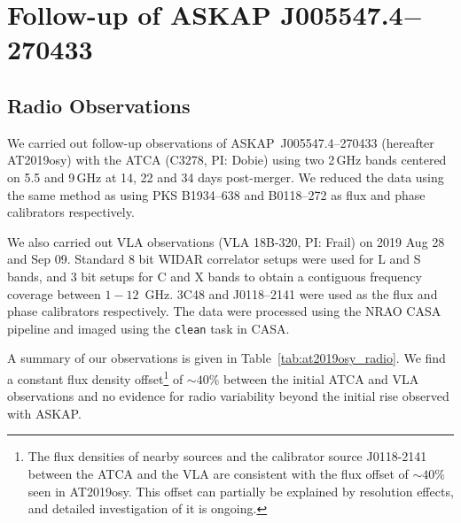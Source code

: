 

\section{Follow-up of ASKAP J005547.4$-$270433}
\label{s_follow}
\subsection{Radio Observations}
\sloppy We carried out follow-up observations of ASKAP~J005547.4--270433 (hereafter AT2019osy) with the ATCA (C3278, PI: Dobie) using two 2\,GHz bands centered on 5.5 and 9\,GHz at 14, 22 and 34 days post-merger. We reduced the data using the same method as \citet{2018ApJ...858L..15D} using PKS B1934--638 and B0118--272 as flux and phase calibrators respectively. 

We also carried out VLA observations (VLA 18B-320, PI: Frail) on 2019 Aug 28 and Sep 09. Standard 8 bit WIDAR correlator setups were used for L and S bands, and 3 bit setups for C and X bands to obtain a contiguous frequency coverage between $1-12$~GHz. 3C48 and J0118--2141 were used as the flux and phase calibrators respectively. The data were processed using the NRAO CASA pipeline and imaged using the \texttt{clean} task in CASA.

A summary of our observations is given in Table~\ref{tab:at2019osy_radio}. We find a constant flux density offset\footnote{The flux densities of nearby sources and the calibrator source J0118-2141 between the ATCA and the VLA are consistent with the flux offset of $\sim 40\%$ seen in AT2019osy. This offset can partially be explained by resolution effects, and detailed investigation of it is ongoing.} of $\sim 40\%$ between the initial ATCA and VLA observations and no evidence for radio variability beyond the initial rise observed with ASKAP.




